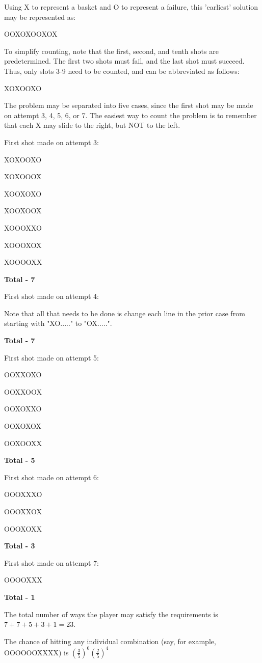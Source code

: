 \begin{enumerate}
 Using X to represent a basket and O to represent a failure, this 'earliest' solution may be represented as:

 OOXOXOOXOX

 To simplify counting, note that the first, second, and tenth shots are predetermined.  The first two shots must fail, and the last shot must succeed.  Thus, only slots 3-9 need to be counted, and can be abbreviated as follows:

 XOXOOXO

 The problem may be separated into five cases, since the first shot may be made on attempt 3, 4, 5, 6, or 7.  The easiest way to count the problem is to remember that each X may slide to the right, but NOT to the left.

 First shot made on attempt 3:

 XOXOOXO

 XOXOOOX

 XOOXOXO

 XOOXOOX

 XOOOXXO

 XOOOXOX

 XOOOOXX

 \textbf{Total - 7}

 First shot made on attempt 4:

 Note that all that needs to be done is change each line in the prior case from starting with "XO....." to "OX.....".

 \textbf{Total - 7}

 First shot made on attempt 5:

 OOXXOXO

 OOXXOOX

 OOXOXXO

 OOXOXOX

 OOXOOXX

 \textbf{Total - 5}

 First shot made on attempt 6:

 OOOXXXO

 OOOXXOX

 OOOXOXX

 \textbf{Total - 3}

 First shot made on attempt 7:

 OOOOXXX

 \textbf{Total - 1}

 The total number of ways the player may satisfy the requirements is $7+7+5+3+1=23$.

 The chance of hitting any individual combination (say, for example, OOOOOOXXXX) is $\left(\frac{3}{5}\right)^6\left(\frac{2}{5}\right)^4$


\end{enumerate}
